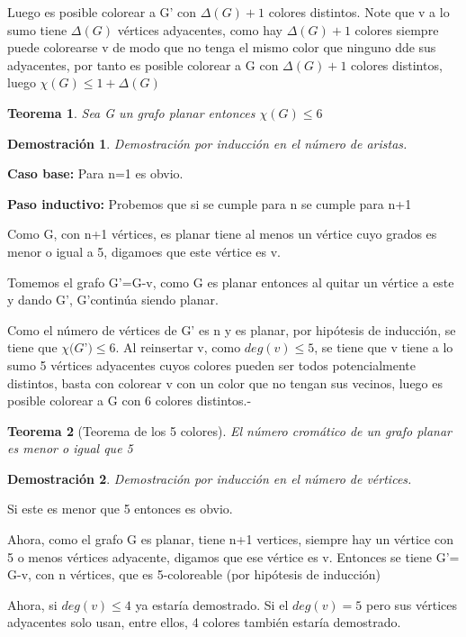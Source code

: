\documentclass[a4paper,1pt]{report}
\newtheorem*{teo}{Teorema}
\newtheorem*{dem}{Demostración}
\begin{document}
Luego es posible colorear a G' con $\Delta(G)+1$ colores distintos. Note que v a lo sumo tiene $\Delta(G)$ vértices adyacentes, como hay $\Delta(G)+1$ colores siempre puede colorearse v de modo que no tenga el mismo color que ninguno dde sus adyacentes, por tanto es posible colorear a G con $\Delta(G)+1$ colores distintos, luego $\chi(G)\leq 1 + \Delta(G)$

\begin{teo}
 Sea G un grafo planar entonces $\chi(G)\leq 6$
\end{teo}

\begin{dem}
Demostración por inducción en el número de aristas.
\end{dem}

\textbf{Caso base:} Para n=1 es obvio.

\textbf{Paso inductivo:} Probemos que si se cumple para n se cumple para n+1

Como G, con n+1 vértices, es planar tiene al menos un vértice cuyo grados es menor o igual a 5, digamoes que este vértice es v.

Tomemos el grafo G'=G-v, como G es planar entonces al quitar un vértice a este y dando G', G'continúa siendo planar. 

Como el número de vértices de G' es n y es planar, por hipótesis de inducción, se tiene que 
$\chi(G$'$)\leq 6$. Al reinsertar v, como $deg(v)\leq 5$, se tiene que v tiene a lo sumo 5 vértices adyacentes cuyos colores pueden ser todos potencialmente distintos, basta con colorear v con un color que no tengan sus vecinos, luego es posible colorear a G con 6 colores distintos.-

\begin{teo}[Teorema de los 5 colores] El número cromático de un grafo planar es menor o igual que 5 
\end{teo}

\begin{dem}
Demostración por inducción en el número de vértices.
\end{dem}


Si este es menor que 5 entonces es obvio.

Ahora, como el grafo G es planar, tiene n+1 vertices, siempre hay un vértice con 5 o menos vértices adyacente, digamos que ese vértice es v. Entonces se tiene G'= G-v, con n vértices, que es 5-coloreable (por hipótesis de inducción)

Ahora, si $deg(v)\leq 4$ ya estaría demostrado. Si el $deg(v)=5$ pero sus vértices adyacentes 
solo usan, entre ellos, 4 colores también estaría demostrado.
\end{document}
